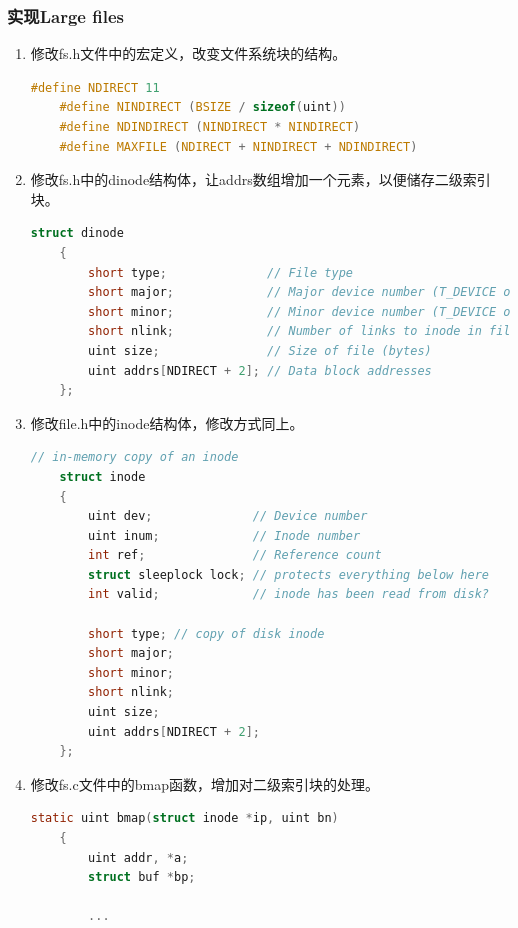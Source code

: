 \subsubsection{实现Large files}
\begin{enumerate}
    \item 修改fs.h文件中的宏定义，改变文件系统块的结构。
          \begin{lstlisting}[language=c,title=修改fs.h宏定义]
    #define NDIRECT 11
    #define NINDIRECT (BSIZE / sizeof(uint))
    #define NDINDIRECT (NINDIRECT * NINDIRECT)
    #define MAXFILE (NDIRECT + NINDIRECT + NDINDIRECT)    
    \end{lstlisting}
    \item 修改fs.h中的dinode结构体，让addrs数组增加一个元素，以便储存二级索引块。
          \begin{lstlisting}[language=c,title=对dinode结构体的修改]
    struct dinode
    {
        short type;              // File type
        short major;             // Major device number (T_DEVICE only)
        short minor;             // Minor device number (T_DEVICE only)
        short nlink;             // Number of links to inode in file system
        uint size;               // Size of file (bytes)
        uint addrs[NDIRECT + 2]; // Data block addresses
    };    
    \end{lstlisting}
    \item 修改file.h中的inode结构体，修改方式同上。
          \begin{lstlisting}[language=c,title=对inode结构体的修改]
    // in-memory copy of an inode
    struct inode
    {
        uint dev;              // Device number
        uint inum;             // Inode number
        int ref;               // Reference count
        struct sleeplock lock; // protects everything below here
        int valid;             // inode has been read from disk?
    
        short type; // copy of disk inode
        short major;
        short minor;
        short nlink;
        uint size;
        uint addrs[NDIRECT + 2];
    };    
    \end{lstlisting}
    \item 修改fs.c文件中的bmap函数，增加对二级索引块的处理。
          \begin{lstlisting}[language=c,title=对bmap函数的修改]
    static uint bmap(struct inode *ip, uint bn)
    {
        uint addr, *a;
        struct buf *bp;
    
        ...
    

\end{lstlisting}
\end{enumerate}
